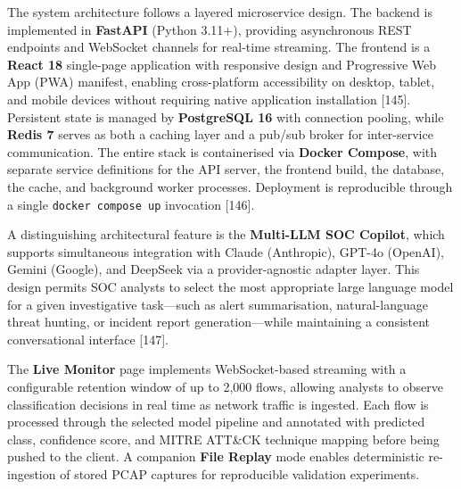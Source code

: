 \documentclass[12pt,a4paper]{article}
\begin{document}
The system architecture follows a layered microservice design.  The
backend is implemented in \textbf{FastAPI} (Python 3.11+), providing
asynchronous REST endpoints and WebSocket channels for real-time
streaming.  The frontend is a \textbf{React 18} single-page
application with responsive design and Progressive Web App (PWA)
manifest, enabling cross-platform accessibility on desktop, tablet,
and mobile devices without requiring native application installation
[145].  Persistent state is managed by \textbf{PostgreSQL 16} with
connection pooling, while \textbf{Redis 7} serves as both a caching
layer and a pub/sub broker for inter-service communication.  The
entire stack is containerised via \textbf{Docker Compose}, with
separate service definitions for the API server, the frontend build,
the database, the cache, and background worker processes.  Deployment
is reproducible through a single \texttt{docker compose up} invocation
[146].

A distinguishing architectural feature is the \textbf{Multi-LLM SOC
Copilot}, which supports simultaneous integration with Claude
(Anthropic), GPT-4o (OpenAI), Gemini (Google), and DeepSeek via a
provider-agnostic adapter layer.  This design permits SOC analysts to
select the most appropriate large language model for a given
investigative task---such as alert summarisation, natural-language
threat hunting, or incident report generation---while maintaining a
consistent conversational interface [147].

The \textbf{Live Monitor} page implements WebSocket-based streaming
with a configurable retention window of up to 2{,}000 flows, allowing
analysts to observe classification decisions in real time as network
traffic is ingested.  Each flow is processed through the selected
model pipeline and annotated with predicted class, confidence score,
and MITRE ATT\&CK technique mapping before being pushed to the
client.  A companion \textbf{File Replay} mode enables deterministic
re-ingestion of stored PCAP captures for reproducible validation
experiments.
\end{document}
